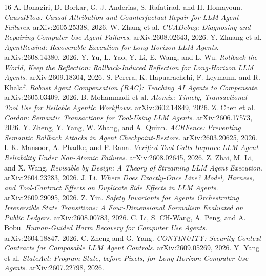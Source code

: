 \documentclass{article}
\begin{document}
\begin{thebibliography}{16}
 A. Bonagiri, D. Borkar, G. J. Anderias, S. Rafatirad, and H. Homayoun. \emph{CausalFlow: Causal Attribution and Counterfactual Repair for LLM Agent Failures}. arXiv:2605.25338, 2026.
 W. Zhang et al. \emph{CUADebug: Diagnosing and Repairing Computer-Use Agent Failures}. arXiv:2608.02643, 2026.
 Y. Zhuang et al. \emph{AgentRewind: Recoverable Execution for Long-Horizon LLM Agents}. arXiv:2608.14380, 2026.
 Y. Yu, L. Yao, Y. Li, E. Wang, and L. Wu. \emph{Rollback the World, Keep the Reflection: Rollback-Induced Reflection for Long-Horizon LLM Agents}. arXiv:2609.18304, 2026.
 S. Perera, K. Hapuarachchi, F. Leymann, and R. Khalaf. \emph{Robust Agent Compensation (RAC): Teaching AI Agents to Compensate}. arXiv:2605.03409, 2026.
 B. Mohammadi et al. \emph{Atomix: Timely, Transactional Tool Use for Reliable Agentic Workflows}. arXiv:2602.14849, 2026.
 Z. Chen et al. \emph{Cordon: Semantic Transactions for Tool-Using LLM Agents}. arXiv:2606.17573, 2026.
 Y. Zheng, Y. Yang, W. Zhang, and A. Quinn. \emph{ACRFence: Preventing Semantic Rollback Attacks in Agent Checkpoint-Restore}. arXiv:2603.20625, 2026.
 I. K. Mansoor, A. Phadke, and P. Rana. \emph{Verified Tool Calls Improve LLM Agent Reliability Under Non-Atomic Failures}. arXiv:2608.02645, 2026.
 Z. Zhai, M. Li, and X. Wang. \emph{Revisable by Design: A Theory of Streaming LLM Agent Execution}. arXiv:2604.23283, 2026.
 J. Li. \emph{Where Does Exactly-Once Live? Model, Harness, and Tool-Contract Effects on Duplicate Side Effects in LLM Agents}. arXiv:2609.29095, 2026.
 Z. Yin. \emph{Safety Invariants for Agents Orchestrating Irreversible State Transitions: A Four-Dimensional Formalism Evaluated on Public Ledgers}. arXiv:2608.00783, 2026.
 C. Li, S. CH-Wang, A. Peng, and A. Bobu. \emph{Human-Guided Harm Recovery for Computer Use Agents}. arXiv:2604.18847, 2026.
 C. Zheng and G. Yang. \emph{CONTINUITY: Security-Context Contracts for Composable LLM Agent Controls}. arXiv:2609.05269, 2026.
 Y. Yang et al. \emph{StateAct: Program State, before Pixels, for Long-Horizon Computer-Use Agents}. arXiv:2607.22798, 2026.
\end{thebibliography}


\end{document}
